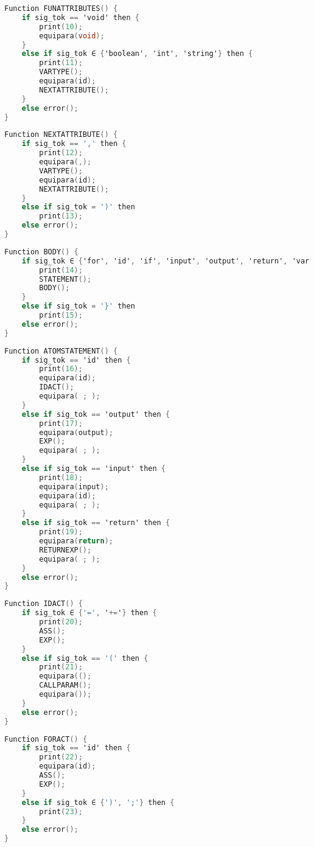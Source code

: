 \begin{lstlisting}[language=C, caption={FUNATTRIBUTES}]
Function FUNATTRIBUTES() {
    if sig_tok == 'void' then {
        print(10);
        equipara(void);
    }
    else if sig_tok ∈ {'boolean', 'int', 'string'} then {
        print(11);
        VARTYPE();
        equipara(id);
        NEXTATTRIBUTE();
    }
    else error();
}
\end{lstlisting}

\begin{lstlisting}[language=C, caption={NEXTATTRIBUTE}]
Function NEXTATTRIBUTE() {
    if sig_tok == ',' then {
        print(12);
        equipara(,);
        VARTYPE();
        equipara(id);
        NEXTATTRIBUTE();
    }
    else if sig_tok = ')' then 
        print(13);
    else error();
}
\end{lstlisting}

\begin{lstlisting}[language=C, caption={BODY}]
Function BODY() {
    if sig_tok ∈ {'for', 'id', 'if', 'input', 'output', 'return', 'var'} then {
        print(14);
        STATEMENT();
        BODY();
    }
    else if sig_tok = '}' then 
        print(15);
    else error();
}
\end{lstlisting}

\begin{lstlisting}[language=C, caption={ATOMSTATEMENT}]
Function ATOMSTATEMENT() {
    if sig_tok == 'id' then {
        print(16);
        equipara(id);
        IDACT();
        equipara( ; );
    }
    else if sig_tok == 'output' then {
        print(17);
        equipara(output);
        EXP();
        equipara( ; );
    }
    else if sig_tok == 'input' then {
        print(18);
        equipara(input);
        equipara(id);
        equipara( ; );
    }
    else if sig_tok == 'return' then {
        print(19);
        equipara(return);
        RETURNEXP();
        equipara( ; );
    }
    else error();
}
\end{lstlisting}

\begin{lstlisting}[language=C, caption={IDACT}]
Function IDACT() {
    if sig_tok ∈ {'=', '+='} then {
        print(20);
        ASS();
        EXP();
    }
    else if sig_tok == '(' then {
        print(21);
        equipara(();
        CALLPARAM();
        equipara());
    }
    else error();
}
\end{lstlisting}

\begin{lstlisting}[language=C, caption={FORACT}]
Function FORACT() {
    if sig_tok == 'id' then {
        print(22);
        equipara(id);
        ASS();
        EXP();
    }
    else if sig_tok ∈ {')', ';'} then {
        print(23);
    }
    else error();
}
\end{lstlisting}

